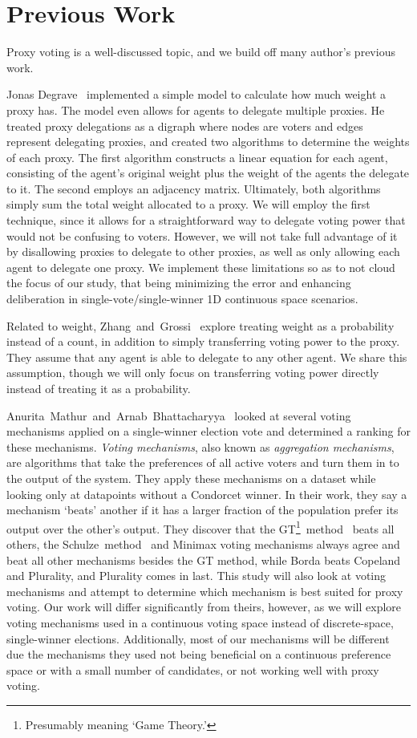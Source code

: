 \section{Previous Work}\label{sec:previous-work}
Proxy voting is a well-discussed topic, and we build off many author's previous work.

Jonas Degrave~\cite{Degrave2014} implemented a simple model to calculate how much
weight a proxy has.
The model even allows for agents to delegate multiple proxies.
He treated proxy delegations as a digraph where nodes are voters and edges represent
delegating proxies, and created two algorithms to determine the weights of each proxy.
The first algorithm constructs a linear equation for each agent, consisting of the
agent's original weight plus the weight of the agents the delegate to it.
The second employs an adjacency matrix.
Ultimately, both algorithms simply sum the total weight allocated to a proxy.
We will employ the first technique, since it allows for a straightforward way to
delegate voting power that would not be confusing to voters.
However, we will not take full advantage of it by disallowing proxies to delegate to
other proxies, as well as only allowing each agent to delegate one proxy.
We implement these limitations so as to not cloud the focus of our study, that being
minimizing the error and enhancing deliberation in single-vote/single-winner 1D
continuous space scenarios.

Related to weight, Zhang~and~Grossi~\cite{Zhang2022} explore treating weight as a
probability instead of a count, in addition to simply transferring voting power to
the proxy.
They assume that any agent is able to delegate to any other agent.
We share this assumption, though we will only focus on transferring voting power
directly instead of treating it as a probability.

Anurita~Mathur~and~Arnab~Bhattacharyya~\cite{Mathur2017} looked at several voting
mechanisms applied on a single-winner election vote and determined a ranking for
these mechanisms.
\textit{Voting mechanisms}, also known as \textit{aggregation mechanisms}, are
algorithms that take the preferences of all active voters and turn them in to the
output of the system.
They apply these mechanisms on a dataset while looking only at datapoints without a
Condorcet winner.
In their work, they say a mechanism `beats' another if it has a larger fraction of
the population prefer its output over the other's output.
They discover that the GT\footnote{
    Presumably meaning `Game Theory.'
}~method~\cite{Rivest2010} beats all others, the Schulze~method~\cite{Schulze2011}
and Minimax voting mechanisms always agree and beat all other mechanisms besides the
GT method, while Borda beats Copeland and Plurality, and Plurality comes in last.
This study will also look at voting mechanisms and attempt to determine which
mechanism is best suited for proxy voting.
Our work will differ significantly from theirs, however, as we will explore voting
mechanisms used in a continuous voting space instead of discrete-space, single-winner
elections.
Additionally, most of our mechanisms will be different due the mechanisms they used
not being beneficial on a continuous preference space or with a small number of
candidates, or not working well with proxy voting.

